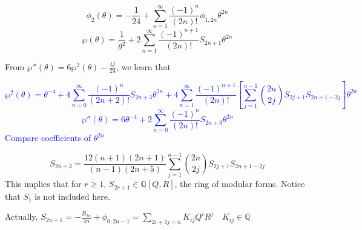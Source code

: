 \documentclass{article}
\begin{document}
\begin{equation}
\phi_2(\theta) = - \frac{1}{24} + \sum\limits_{n=1}^{\infty} \frac{(-1)^n}{(2n)!}\phi_{1,2n}\theta^{2n}
\end{equation}
\begin{equation}
\wp(\theta) = \frac{1}{\theta^2} + 2 \sum\limits_{n=1}^{\infty} \frac{(-1)^{n+1}}{(2n)!}S_{2n+1}\theta^{2n}
\end{equation}

From $\wp''(\theta) = 6\wp^2(\theta) - \frac{Q}{24}$, we learn that

\textcolor{blue}{
\[\wp^2(\theta)= \theta^{-4} + 4 \sum\limits_{n=0}^{\infty} \frac{(-1)^n}{(2n+2)!}S_{2n+3}\theta^{2n} + 4 \sum\limits_{n=1}^{\infty} \frac{(-1)^{n+1}}{(2n)!} \left[\sum\limits_{j=1}^{n-1} \binom{2n}{2j}S_{2j+1}S_{2n+1-2j}\right] \theta^{2n}\]
\[\wp''(\theta) = 6\theta^{-4} + 2 \sum\limits_{n=0}^{\infty}\frac{(-1)^n}{(2n)!}S_{2n+3}\theta^{2n} \]
Compare coefficients of $\theta^{2n}$
}


\begin{equation}
S_{2n+3} = \frac{12(n+1)(2n+1)}{(n-1)(2n+5)} \sum\limits_{j=1}^{n-1} \binom{2n}{2j}S_{2j+1}S_{2n+1-2j}
\end{equation}
This implies that for $r\geq 1$, $S_{2r+1}\in \mathbb{Q}[Q,R]$, the ring of modular forms. Notice that $S_1$ is not included here.

Actually, $S_{2n-1} = -\frac{B_{2n}}{4n} + \phi_{0,2n-1} = \sum\limits_{2i+3j=n}^{}K_{ij}Q^iR^j \quad K_{ij}\in \mathbb{Q}$
\end{document}
